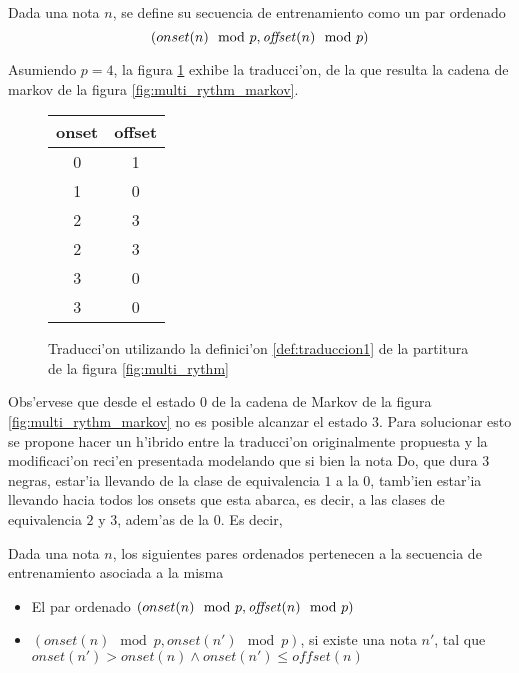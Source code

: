 \begin{definition}
\label{def:traduccion1}
Dada una nota $n$, se define su secuencia de entrenamiento como un par ordenado $$(onset(n) \mod p, \text{\emph{offset}}(n)\mod p)$$
\end{definition}

Asumiendo $p=4$, la figura \ref{fig:multi_rythm_translation} exhibe la traducci'on, de la que resulta la cadena de markov de la figura \ref{fig:multi_rythm_markov}.

\begin{figure}[!h]
\begin{center}
\begin{tabular}{c | c} 
onset & offset \\
\hline
0 & 1 \\
1 & 0 \\
2 & 3 \\
2 & 3 \\
3 & 0 \\
3 & 0 \\
\end{tabular}
\caption{ Traducci'on utilizando la definici'on \ref{def:traduccion1} de la partitura de la figura \ref{fig:multi_rythm}}
\label{fig:multi_rythm_translation}

\end{center}
\end{figure}

\begin{imagen}
    \width{7cm}
\end{imagen}

Obs'ervese que desde el estado $0$ de la cadena de Markov de la figura \ref{fig:multi_rythm_markov} no es posible alcanzar el estado $3$. Para solucionar esto se propone hacer un h'ibrido
entre la traducci'on originalmente propuesta y la modificaci'on reci'en presentada modelando que si bien la nota Do, que dura $3$ negras, estar'ia
llevando de la clase de equivalencia $1$ a la $0$, tamb'ien estar'ia llevando hacia todos los onsets que esta abarca, es decir,
a las clases de equivalencia $2$ y $3$, adem'as de la $0$. Es decir,


\begin{definition}
\label{def:traduccion2}
Dada una nota $n$, los siguientes pares ordenados pertenecen a la secuencia de entrenamiento asociada a la misma
\begin{itemize}
 \item El par ordenado $(onset(n) \mod p, \text{\emph{offset}}(n)\mod p)$
 \item $(onset(n) \mod p, onset(n') \mod p)$, si existe una nota $n'$, tal que $onset(n') > onset(n) \land onset(n') \leq offset(n)$
\end{itemize}
\end{definition}

